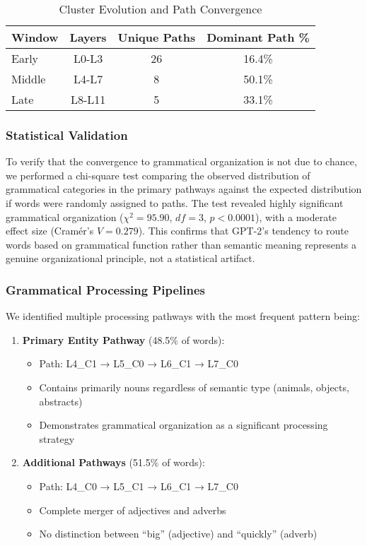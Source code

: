 \begin{table}[h!]
\centering
\caption{Cluster Evolution and Path Convergence}
\label{tab:cluster_evolution}
\begin{tabular}{lccc}
\toprule
Window & Layers & Unique Paths & Dominant Path \% \\
\midrule
Early & L0-L3 & 26 & 16.4\% \\
Middle & L4-L7 & 8 & 50.1\% \\
Late & L8-L11 & 5 & 33.1\% \\
\bottomrule
\end{tabular}
\end{table}

\subsubsection{Statistical Validation}

To verify that the convergence to grammatical organization is not due to chance, we performed a chi-square test comparing the observed distribution of grammatical categories in the primary pathways against the expected distribution if words were randomly assigned to paths. The test revealed highly significant grammatical organization ($\chi^2 = 95.90$, $df = 3$, $p < 0.0001$), with a moderate effect size (Cramér's $V = 0.279$). This confirms that GPT-2's tendency to route words based on grammatical function rather than semantic meaning represents a genuine organizational principle, not a statistical artifact.

\subsubsection{Grammatical Processing Pipelines}

We identified multiple processing pathways with the most frequent pattern being:

\begin{enumerate}
    \item \textbf{Primary Entity Pathway} (48.5\% of words):
    \begin{itemize}
        \item Path: L4\_C1 → L5\_C0 → L6\_C1 → L7\_C0
        \item Contains primarily nouns regardless of semantic type (animals, objects, abstracts)
        \item Demonstrates grammatical organization as a significant processing strategy
    \end{itemize}
    
    \item \textbf{Additional Pathways} (51.5\% of words):
    \begin{itemize}
        \item Path: L4\_C0 → L5\_C1 → L6\_C1 → L7\_C0
        \item Complete merger of adjectives and adverbs
        \item No distinction between ``big'' (adjective) and ``quickly'' (adverb)
    \end{itemize}
\end{enumerate}

